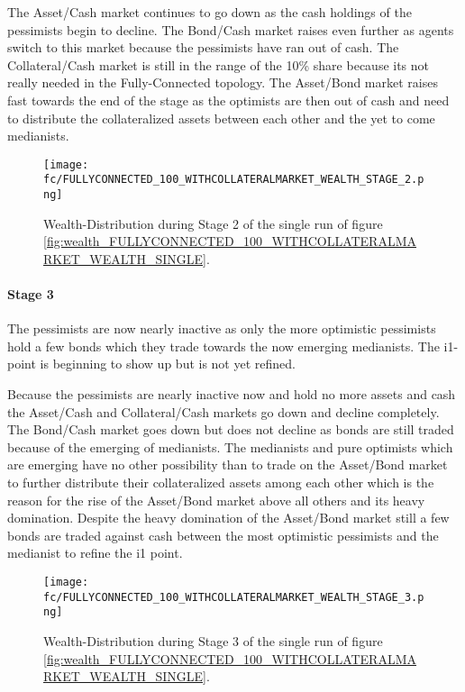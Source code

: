 \documentclass[Bachelorarbeit.tex]{subfiles}
\begin{document}
\medskip

The Asset/Cash market continues to go down as the cash holdings of the pessimists begin to decline. The Bond/Cash market raises even further as agents switch to this market because the pessimists have ran out of cash. The Collateral/Cash market is still in the range of the 10\% share because its not really needed in the Fully-Connected topology. The Asset/Bond market raises fast towards the end of the stage as the optimists are then out of cash and need to distribute the collateralized assets between each other and the yet to come medianists.

\begin{figure}[H]
	\centering
  \texttt{[image: fc/FULLYCONNECTED\_100\_WITHCOLLATERALMARKET\_WEALTH\_STAGE\_2.png]}
  	\caption{Wealth-Distribution during Stage 2 of the single run of figure \ref{fig:wealth_FULLYCONNECTED_100_WITHCOLLATERALMARKET_WEALTH_SINGLE}.}
	\label{fig:markets_FULLYCONNECTED_100_WITHCOLLATERALMARKET_WEALTH_STAGE_2}
\end{figure}

\paragraph{Stage 3}
The pessimists are now nearly inactive as only the more optimistic pessimists hold a few bonds which they trade towards the now emerging medianists. The i1-point is beginning to show up but is not yet refined. 

\medskip

Because the pessimists are nearly inactive now and hold no more assets and cash the Asset/Cash and Collateral/Cash markets go down and decline completely. The Bond/Cash market goes down but does not decline as bonds are still traded because of the emerging of medianists. The medianists and pure optimists which are emerging have no other possibility than to trade on the Asset/Bond market to further distribute their collateralized assets among each other which is the reason for the rise of the Asset/Bond market above all others and its heavy domination. Despite the heavy domination of the Asset/Bond market still a few bonds are traded against cash between the most optimistic pessimists and the medianist to refine the i1 point.

\begin{figure}[H]
	\centering
  \texttt{[image: fc/FULLYCONNECTED\_100\_WITHCOLLATERALMARKET\_WEALTH\_STAGE\_3.png]}
  	\caption{Wealth-Distribution during Stage 3 of the single run of figure \ref{fig:wealth_FULLYCONNECTED_100_WITHCOLLATERALMARKET_WEALTH_SINGLE}.}
	\label{fig:markets_FULLYCONNECTED_100_WITHCOLLATERALMARKET_WEALTH_STAGE_3}
\end{figure}
\end{document}
